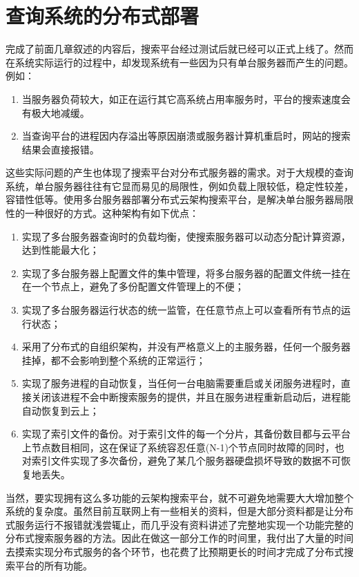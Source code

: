 
\chapter{查询系统的分布式部署}
\label{chap:c5}

完成了前面几章叙述的内容后，搜索平台经过测试后就已经可以正式上线了。然而在系统实际运行的过程中，却发现系统有一些因为只有单台服务器而产生的问题。例如：
\begin{enumerate}
\item 当服务器负荷较大，如正在运行其它高系统占用率服务时，平台的搜索速度会有极大地减缓。
\item 当查询平台的进程因内存溢出等原因崩溃或服务器计算机重启时，网站的搜索结果会直接报错。
\end{enumerate}

这些实际问题的产生也体现了搜索平台对分布式服务器的需求。对于大规模的查询系统，单台服务器往往有它显而易见的局限性，例如负载上限较低，稳定性较差，容错性低等。使用多台服务器部署分布式云架构搜索平台，是解决单台服务器局限性的一种很好的方式。这种架构有如下优点：
\begin{enumerate}
\item 实现了多台服务器查询时的负载均衡，使搜索服务器可以动态分配计算资源，达到性能最大化；
\item 实现了多台服务器上配置文件的集中管理，将多台服务器的配置文件统一挂在在一个节点上，避免了多份配置文件管理上的不便；
\item 实现了多台服务器运行状态的统一监管，在任意节点上可以查看所有节点的运行状态；
\item 采用了分布式的自组织架构，并没有严格意义上的主服务器，任何一个服务器挂掉，都不会影响到整个系统的正常运行；
\item 实现了服务进程的自动恢复，当任何一台电脑需要重启或关闭服务进程时，直接关闭该进程不会中断搜索服务的提供，并且在服务进程重新启动后，进程能自动恢复到云上；
\item 实现了索引文件的备份。对于索引文件的每一个分片，其备份数目都与云平台上节点数目相同，这在保证了系统容忍任意(N-1)个节点同时故障的同时，也对索引文件实现了多次备份，避免了某几个服务器硬盘损坏导致的数据不可恢复地丢失。
\end{enumerate}

当然，要实现拥有这么多功能的云架构搜索平台，就不可避免地需要大大增加整个系统的复杂度。虽然目前互联网上有一些相关的资料，但是大部分资料都是让分布式服务运行不报错就浅尝辄止，而几乎没有资料讲述了完整地实现一个功能完整的分布式搜索服务器的方法。因此在做这一部分工作的时间里，我付出了大量的时间去摸索实现分布式服务的各个环节，也花费了比预期更长的时间才完成了分布式搜索平台的所有功能。

